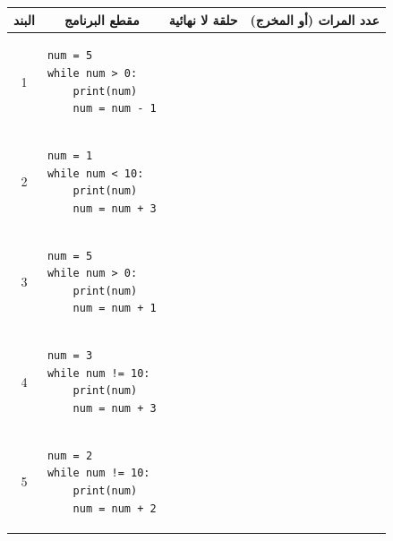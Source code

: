 \documentclass[14pt]{extarticle}
\begin{document}
{\small
\renewcommand{\arraystretch}{1.3}
\begin{longtable}{|c|p{}|p{}|p{}|}
\hline
\multicolumn{1}{|c|}{\textbf{البند}} & \multicolumn{1}{c|}{\textbf{مقطع البرنامج}} & \multicolumn{1}{c|}{\textbf{حلقة لا نهائية}} & \multicolumn{1}{c|}{\textbf{عدد المرات (أو المخرج)}} \\
\hline
\endhead
1 &
\begin{pycell}
\begin{english}
\begin{verbatim}
num = 5
while num > 0:
    print(num)
    num = num - 1
\end{verbatim}
\end{english}
\end{pycell} & \rule{0pt}{1.7cm} & \\
\hline
2 &
\begin{pycell}
\begin{english}
\begin{verbatim}
num = 1
while num < 10:
    print(num)
    num = num + 3
\end{verbatim}
\end{english}
\end{pycell} & \rule{0pt}{1.7cm} & \\
\hline
3 &
\begin{pycell}
\begin{english}
\begin{verbatim}
num = 5
while num > 0:
    print(num)
    num = num + 1
\end{verbatim}
\end{english}
\end{pycell} & \rule{0pt}{1.7cm} & \\
\hline
4 &
\begin{pycell}
\begin{english}
\begin{verbatim}
num = 3
while num != 10:
    print(num)
    num = num + 3
\end{verbatim}
\end{english}
\end{pycell} & \rule{0pt}{1.7cm} & \\
\hline
5 &
\begin{pycell}
\begin{english}
\begin{verbatim}
num = 2
while num != 10:
    print(num)
    num = num + 2
\end{verbatim}
\end{english}
\end{pycell} & \rule{0pt}{1.7cm} & \\
\hline
\end{longtable}
}
\end{document}
